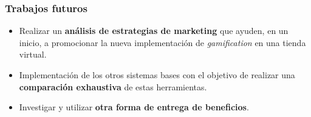 \documentclass[10pt, compress]{beamer}
\begin{document}
\begin{frame}
 \frametitle{Trabajos futuros}

\begin{itemize}

\item Realizar un \textbf{análisis de estrategias de marketing} que ayuden, en un inicio, a promocionar la nueva 
implementación de \emph{gamification} en una tienda virtual.
\item Implementación de los otros sistemas bases con el objetivo de realizar una \textbf{comparación exhaustiva}
de estas herramientas.
\item Investigar y utilizar \textbf{otra forma de entrega de beneficios}.
\end{itemize}
\end{frame}

\maketitle
\end{document}
